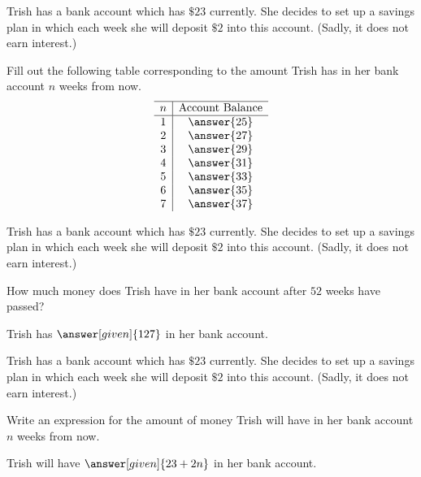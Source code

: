 \documentclass[nooutcomes]{ximera}
\begin{document}
\begin{problem}
Trish has a bank account which has $\$23$ currently.  She decides to set up a savings plan in which each week she will deposit $\$2$ into this account. (Sadly, it does not earn interest.)

Fill out the following table corresponding to the amount Trish has in her bank account $n$ weeks from now.
\[
\begin{array}{c|c} \hline
n & \text{Account Balance} \\ \hline
1 & \answer{25} \\
2 & \answer{27} \\
3 & \answer{29}\\
4 & \answer{31}\\
5 & \answer{33}\\
6 & \answer{35}\\
7 & \answer{37}\\
\end{array}
\]
\end{problem}



\begin{problem}
Trish has a bank account which has $\$23$ currently.  She decides to set up a savings plan in which each week she will deposit $\$2$ into this account. (Sadly, it does not earn interest.)

How much money does Trish have in her bank account after $52$ weeks have passed?

\begin{prompt}
Trish has $\answer[given]{127}$ in her bank account.
\end{prompt}
\end{problem}




\begin{problem}
Trish has a bank account which has $\$23$ currently.  She decides to set up a savings plan in which each week she will deposit $\$2$ into this account. (Sadly, it does not earn interest.)

Write an expression for the amount of money Trish will have in her bank account $n$ weeks from now.

\begin{prompt}
Trish will have $\answer[given]{23+2n}$ in her bank account.
\end{prompt}
\end{problem}
\end{document}
